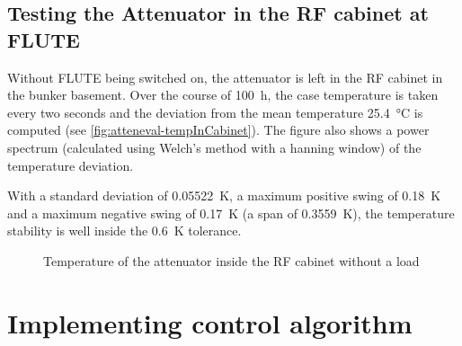 \FloatBarrier
\subsection{Testing the Attenuator in the RF cabinet at FLUTE}
Without FLUTE being switched on, the attenuator is left in the RF cabinet in the bunker basement. Over the course of \SI{100}{\hour}, the case temperature is taken every two seconds and the deviation from the mean temperature \SI{25.4}{\degreeCelsius} is computed (see \autoref{fig:atteneval-tempInCabinet}). The figure also shows a power spectrum (calculated using Welch's method with a hanning window) of the temperature deviation.

With a standard deviation of \SI{0.05522}{\kelvin}, a maximum positive swing of \SI{0.18}{\kelvin} and a maximum negative swing of \SI{0.17}{\kelvin} (a span of \SI{0.3559}{\kelvin}), the temperature stability is well inside the \SI{0.6}{\kelvin} tolerance.

\begin{figure}[tb]
		\hfill
        \subfloat[Time]{}
        
        \hfill
       \caption{Temperature of the attenuator inside the RF cabinet without a load}
    \label{fig:atteneval-tempInCabinet}
\end{figure}








\FloatBarrier
\newpage
\section{Implementing control algorithm}
